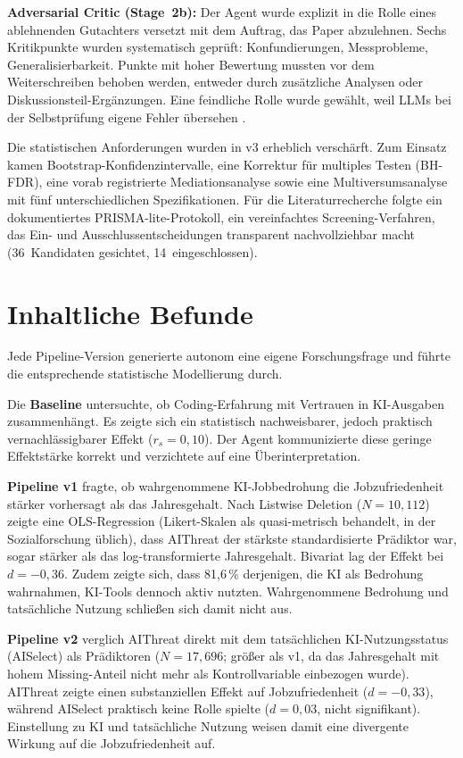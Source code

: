 \documentclass[11pt,a4paper]{article}
\begin{document}
\textbf{Adversarial Critic (Stage~2b):} Der Agent wurde explizit in die Rolle eines
ablehnenden Gutachters versetzt mit dem Auftrag, das Paper abzulehnen. Sechs
Kritikpunkte wurden systematisch geprüft: Konfundierungen, Messprobleme,
Generalisierbarkeit. Punkte mit hoher Bewertung mussten vor dem Weiterschreiben
behoben werden, entweder durch zusätzliche Analysen oder Diskussionsteil-Ergänzungen.
Eine feindliche Rolle wurde gewählt, weil LLMs bei der Selbstprüfung eigene Fehler
übersehen \cite{badscientist2025}.

Die statistischen Anforderungen wurden in v3 erheblich verschärft. Zum Einsatz kamen
Boot\-strap-Kon\-fi\-denz\-inter\-valle, eine Korrektur für multiples Testen (BH-FDR),
eine vorab registrierte Mediationsanalyse sowie eine Multiversumsanalyse mit fünf
unterschiedlichen Spezifikationen. Für die Literaturrecherche folgte ein dokumentiertes PRISMA-lite-Protokoll,
ein vereinfachtes Screening-Verfahren, das Ein- und Ausschlussentscheidungen
transparent nachvollziehbar macht (36~Kandidaten gesichtet, 14~eingeschlossen).

\clearpage

\section{Inhaltliche Befunde}

Jede Pipeline-Version generierte autonom eine eigene Forschungsfrage und führte
die entsprechende statistische Modellierung durch.

Die \textbf{Baseline} untersuchte, ob Coding-Erfahrung mit Vertrauen in
KI-Ausgaben zusammenhängt. Es zeigte sich ein statistisch nachweisbarer, jedoch praktisch vernachlässigbarer
Effekt ($r_s = 0{,}10$). Der Agent kommunizierte diese geringe Effektstärke korrekt
und verzichtete auf eine Überinterpretation.

\textbf{Pipeline v1} fragte, ob wahrgenommene KI-Jobbedrohung die
Jobzufriedenheit stärker vorhersagt als das Jahresgehalt. Nach Listwise Deletion
($N = 10{,}112$) zeigte eine OLS-Regression (Likert-Skalen als quasi-metrisch
behandelt, in der Sozialforschung üblich), dass AIThreat der stärkste
standardisierte Prädiktor war, sogar stärker als das log-transformierte
Jahresgehalt. Bivariat lag der Effekt bei $d = -0{,}36$. Zudem zeigte sich, dass 81{,}6\,\% derjenigen, die KI als Bedrohung wahrnahmen,
KI-Tools dennoch aktiv nutzten. Wahrgenommene Bedrohung und tatsächliche Nutzung
schließen sich damit nicht aus.

\textbf{Pipeline v2} verglich AIThreat direkt mit dem tatsächlichen
KI-Nutzungsstatus (AISelect) als Prädiktoren ($N = 17{,}696$; größer als v1,
da das Jahresgehalt mit hohem Missing-Anteil nicht mehr als Kontrollvariable
einbezogen wurde). AIThreat zeigte einen substanziellen Effekt auf Jobzufriedenheit
($d = -0{,}33$), während AISelect praktisch keine Rolle spielte ($d = 0{,}03$,
nicht signifikant). Einstellung zu KI und tatsächliche Nutzung weisen damit eine divergente Wirkung
auf die Jobzufriedenheit auf.
\end{document}
